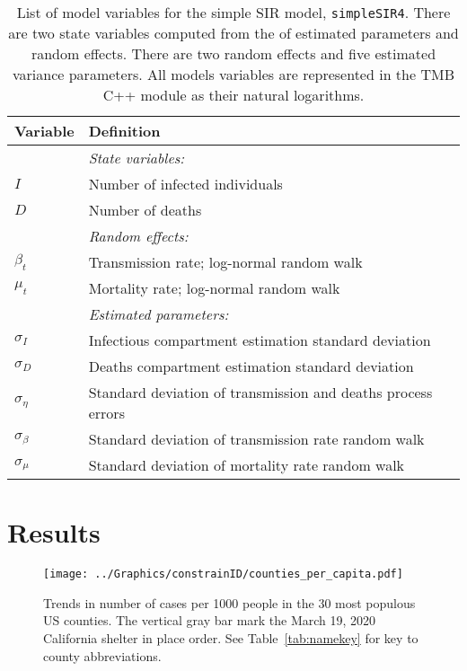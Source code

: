 \documentclass[12pt,letterpaper]{article}
\newcommand\SSm{{\tt simpleSIR4}}
\begin{document}
\begin{table}[!hb]
\caption{List of model variables for the simple SIR model, \SSm.
There are two state variables computed from the of estimated
parameters and random effects.
There are two random effects and five estimated variance parameters.
All models variables are represented in the TMB C++ module as their
natural logarithms.
}
\label{tab:allvars1}
\begin{center}
\begin{tabular}{ll}
\hline
Variable & Definition\\
\hline
\hline
       & {\it State variables:}\\
$I$      & Number of infected individuals\\
$D$      & Number of deaths\\
       & {\it Random effects:}\\
$\beta_t$ & Transmission rate; log-normal random walk\\
$\mu_t$   & Mortality rate; log-normal random walk\\
       & {\it Estimated parameters:}\\
$\sigma_I$ & Infectious compartment estimation standard deviation\\
$\sigma_D$ & Deaths compartment estimation standard deviation\\
$\sigma_\eta$ & Standard deviation of transmission and deaths process errors\\
$\sigma_\beta$ & Standard deviation of transmission rate random walk\\
$\sigma_\mu$ & Standard deviation of mortality rate random walk\\
\hline
\end{tabular}
\end{center}
\end{table}

\section*{Results}

\begin{figure}[h!]
\begin{center}
\texttt{[image: ../Graphics/constrainID/counties\_per\_capita.pdf]}
\end{center}
\caption{\label{fig:percap}
Trends in number of cases per 1000 people in the 30 most populous US
counties.
The vertical gray bar mark the March 19, 2020 California shelter in place order.
See Table~\ref{tab:namekey} for key to county abbreviations.
}
\end{figure}
\end{document}
